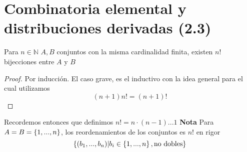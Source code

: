 \section{Combinatoria elemental y distribuciones derivadas (2.3)}

\begin{lema}
	Para $n \in \mathbb{N} $ $A,B $ conjuntos con la misma cardinalidad finita, existen $n!$ bijecciones entre $A$ y $B$
\end{lema}
\begin{proof}
	Por inducción. El caso grave, es el inductivo con la idea general para el cual utilizamos 
\[ (n+1)n! = (n+1)! \]
\end{proof}
Recordemos entonces que definimos $ n! = n\cdot(n-1)...1 $
\textbf{Nota} Para $ A  = B = \left\lbrace 1,..., n \right\rbrace$, los reordenamientos de los conjuntos es $ n! $
en rigor
\[  \left\lbrace (b_1, ..., b_n) | b_i \in \left\lbrace 1, ...,n  \right\rbrace, \textrm{no dobles} \right\rbrace \]

